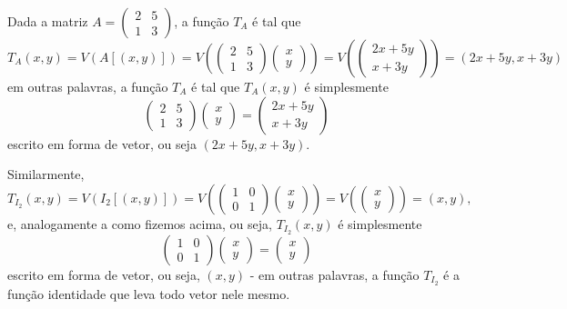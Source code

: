 \begin{ex}
	Dada a matriz $A=\begin{pmatrix}
	2 & 5\\
	1 & 3
	\end{pmatrix}$, a função $T_A$ é tal que
	\[T_A(x,y)=V(A[(x,y)])=V\left(\begin{pmatrix}
	2 & 5\\
	1 & 3
	\end{pmatrix}\begin{pmatrix}
	x\\y
	\end{pmatrix}\right)=V\left(\begin{pmatrix}
	2x+5y\\x+3y
	\end{pmatrix}\right)=(2x+5y,x+3y)\]em outras palavras, a função $T_A$ é tal que $T_A(x,y)$ é simplesmente
	\[\begin{pmatrix}
	2 & 5\\
	1 & 3
	\end{pmatrix}\begin{pmatrix}
	x\\y
	\end{pmatrix}=\begin{pmatrix}
	2x+5y\\x+3y
	\end{pmatrix}\]escrito em forma de vetor, ou seja $(2x+5y,x+3y)$.
	
	Similarmente,
	\[T_{I_2}(x,y)=V(I_2[(x,y)])=V\left(\begin{pmatrix}
	1&0\\0&1
	\end{pmatrix}\begin{pmatrix}
	x\\y
	\end{pmatrix}\right)=V\left(\begin{pmatrix}
	x\\y
	\end{pmatrix}\right)=(x,y),\]e, analogamente a como fizemos acima, ou seja, $T_{I_2}(x,y)$ é simplesmente
	\[\begin{pmatrix}
	1&0\\0&1
	\end{pmatrix}\begin{pmatrix}
	x\\y
	\end{pmatrix}=\begin{pmatrix}
	x\\y
	\end{pmatrix}\] escrito em forma de vetor, ou seja, $(x,y)$ - em outras palavras, a função $T_{I_2}$ é a função identidade que leva todo vetor nele mesmo.
\end{ex}

